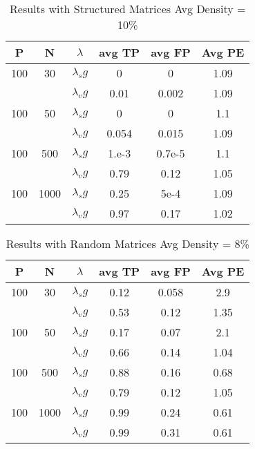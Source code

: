 \documentclass{article}
\begin{document}
%




\begin{table}
\caption{Results with Structured Matrices Avg Density = 10\%}
\begin{tabular}{|c|c|c|c|c|c|}
	     \hline
	     \textbf{P} &  \textbf{N} &$\lambda$& \textbf{ avg TP} & \textbf{avg FP} & \textbf{Avg PE} \\
	     \hline
         \hline
		 100&30   & $\lambda_sg$ & 0 & 0 &1.09\\
         &   & $\lambda_vg$& 0.01 & 0.002 & 1.09 \\
         \hline
         100&50    &$\lambda_sg$ & 0 & 0 &1.1\\
         &    &$\lambda_vg$& 0.054 & 0.015 & 1.09 \\
         \hline
         100&500   &$\lambda_sg$ & 1.e-3 & 0.7e-5 &1.1\\
         &    &$\lambda_vg$ & 0.79 & 0.12 & 1.05 \\
         \hline
         100&  1000    &$\lambda_sg$& 0.25 & 5e-4 & 1.09\\
         &    &$\lambda_vg$ & 0.97 & 0.17 & 1.02 \\
         		
\hline
\end{tabular}
\label{table:t1}
\end{table}




\begin{table}
\caption{Results with Random Matrices Avg Density = 8\%}
\begin{tabular}{|c|c|c|c|c|c|}
	     \hline
	     \textbf{P} &  \textbf{N} &$\lambda$& \textbf{ avg TP} & \textbf{avg FP} & \textbf{Avg PE} \\
	     \hline
         \hline
		 100&30   & $\lambda_sg$ & 0.12 & 0.058 &2.9\\
         &   & $\lambda_vg$& 0.53 & 0.12 & 1.35 \\
         \hline
         100&50    &$\lambda_sg$ & 0.17 & 0.07 &2.1\\
         &    &$\lambda_vg$& 0.66 & 0.14 & 1.04 \\
         \hline
         100&500   &$\lambda_sg$ & 0.88 & 0.16 &0.68\\
         &    &$\lambda_vg$ & 0.79 & 0.12 & 1.05 \\
         \hline
         100&  1000    &$\lambda_sg$& 0.99 & 0.24 & 0.61\\
         &    &$\lambda_vg$ & 0.99 & 0.31 & 0.61\\
         		
\hline
\end{tabular}
\label{table:t1}
\end{table}
\end{document}

